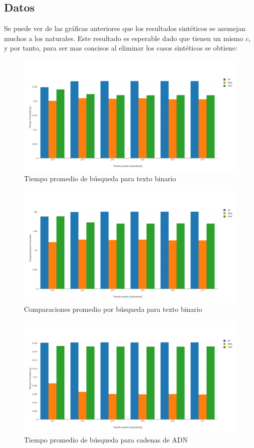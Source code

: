 \documentclass[14pt,letterpaper,hidelinks]{extarticle}
\begin{document}
	\subsection{Datos}
	Se puede ver de las gráficas anteriores que los resultados sintéticos se asemejan muchos
	a los naturales. Este resultado es esperable dado que tienen un mismo $c$, y por tanto,
	para ser mas concisos al eliminar los casos sintéticos se obtiene:
		\begin{figure}[ht!]
			\centering
			\includegraphics[scale=0.5]{img/tBINA.pdf}
			\caption{Tiempo promedio de búsqueda para texto binario} \label{construccion}
		\end{figure}
			\newpage
		\begin{figure}[ht!]
			\centering
			\includegraphics[scale=0.5]{img/cBINA.pdf}
			\caption{Comparaciones promedio por búsqueda para texto binario} \label{construccion}
		\end{figure}
	\newpage
		\begin{figure}[ht!]
			\centering
			\includegraphics[scale=0.5]{img/tRDNA.pdf}
			\caption{Tiempo promedio de búsqueda para cadenas de ADN} \label{construccion}
		\end{figure}
\end{document}
